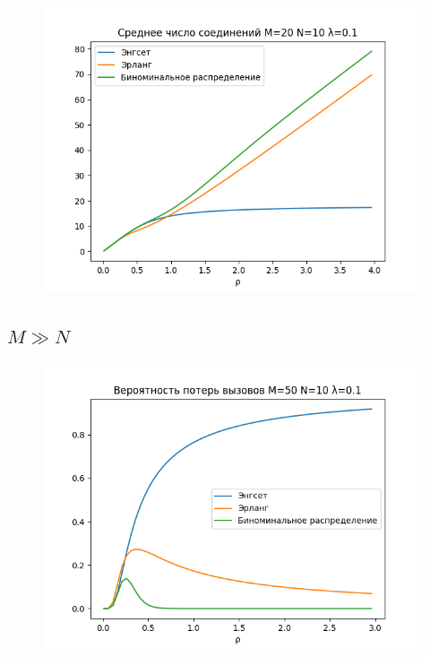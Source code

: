 \documentclass[12pt]{article}
\let\Oldsubsection\subsection
\renewcommand{\subsection}{\FloatBarrier\Oldsubsection}
\begin{document}
\begin{figure}[!htb]
\centering
\includegraphics[scale=1.00]{assets/iss_3/aver_conn_M20_N10_lam01.png}
\caption{}
\label{}
\end{figure}

\subsection{$M ≫ N$}
\begin{figure}[!htb]
\centering
\includegraphics[scale=1.00]{assets/iss_3/loss_prob_M50_N10_lam01.png}
\caption{}
\label{}
\end{figure}
\end{document}
